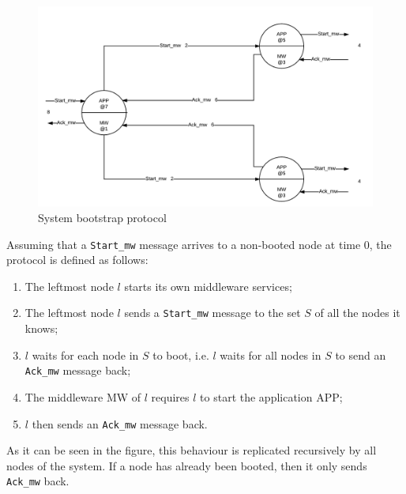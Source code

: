 \begin{figure}[H]
  \centering
  \includegraphics[width=\columnwidth]{sections/images/solution/bootstrap.pdf}
  \caption{System bootstrap protocol}
  \label{fig:sys-bootstrap-protocol}
\end{figure}

Assuming that a \texttt{Start\_mw} message arrives to a non-booted node at time
0, the protocol is defined as follows:

\begin{enumerate}
  \item The leftmost node $l$ starts its own middleware services;
  \item The leftmost node $l$ sends a \texttt{Start\_mw} message to the set
    $S$ of all the nodes it knows;
  \item $l$ waits for each node in $S$ to boot, i.e. $l$ waits for all nodes
    in $S$ to send an \texttt{Ack\_mw} message back;
  \item The middleware MW of $l$ requires $l$ to start the application APP;
  \item $l$ then sends an \texttt{Ack\_mw} message back.
\end{enumerate}

As it can be seen in the figure, this behaviour is replicated recursively
by all nodes of the system. If a node has already been booted, then it only
sends \texttt{Ack\_mw} back.
